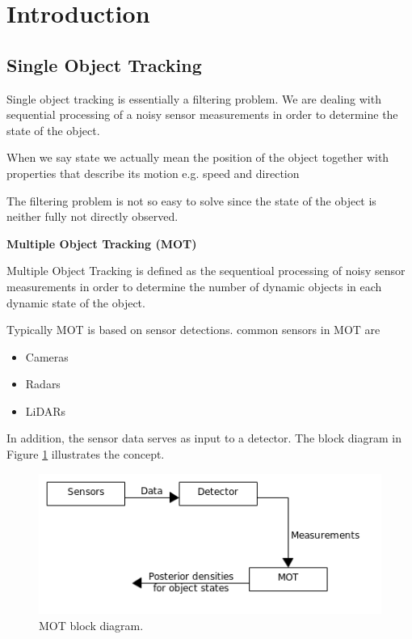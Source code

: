 \section{Introduction}
\label{introduction}


\subsection{Single Object Tracking}

Single object tracking is essentially a filtering problem. We are dealing with sequential processing of a noisy
sensor measurements in order to determine the state of the object.

\begin{framed}
\begin{remark}{}

When we say state we actually mean the position of the object together with properties that describe
its motion e.g. speed and direction
\end{remark}
\end{framed}

The filtering problem is not so easy to solve since the state of the object is neither fully not directly observed.


\begin{framed}
\begin{definition}{\textbf{Multiple Object Tracking (MOT)}}

Multiple Object Tracking is defined as the sequentioal processing of noisy sensor measurements in order to determine
the number of dynamic objects in each dynamic state of the object.  
\end{definition}
\end{framed}


Typically MOT is based on sensor detections. common sensors in MOT are

\begin{itemize}
\item Cameras
\item Radars
\item LiDARs
\end{itemize}

In addition, the sensor data serves as input to a detector. The block diagram in Figure \ref{sensor_mot_block_diagram} illustrates the concept.

\begin{figure}[!htb]
\begin{center}
\includegraphics[scale=0.480]{img/object_tracking/sensor_mot_block_diagram.png}
\end{center}
\caption{MOT block diagram.}
\label{sensor_mot_block_diagram}
\end{figure}

